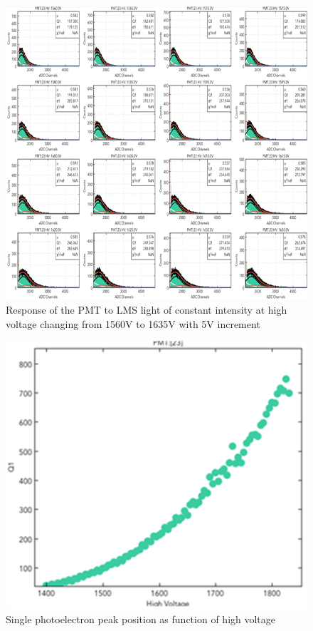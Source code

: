 \begin{figure}[h]
\centering
\includegraphics[width=0.99\linewidth]{images/WILLIAM_2.png}
\caption{Response of the PMT to LMS light of constant intensity at high voltage changing from 1560V to 1635V with 5V increment}
\label{fig:WILLIAM_2}
\end{figure}

\begin{figure}[h]
\centering
\includegraphics[width=0.99\linewidth]{images/WILLIAM_3.png}
\caption{Single photoelectron peak position as function of high voltage}
\label{fig:WILLIAM_3}
\end{figure}


